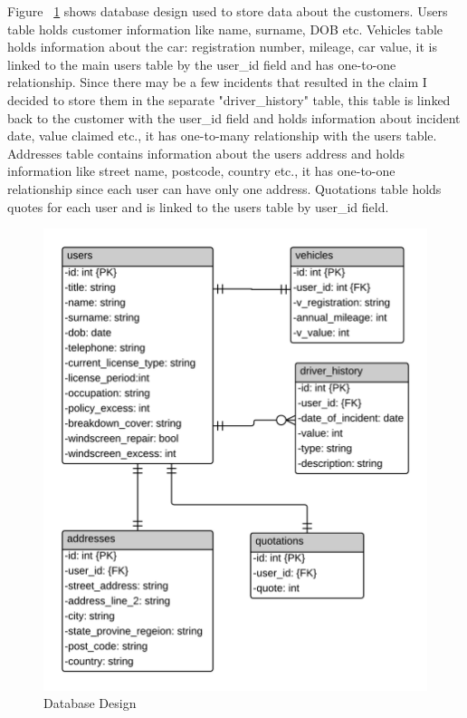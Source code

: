 \documentclass[10pt,a4paper,headinclude=true,twoside]{report}
\begin{document}
Figure ~\ref{fig:DatabaseDesign} shows database design used to store data about the customers. Users table holds customer information like name, surname, DOB etc. Vehicles table holds information about the car: registration number, mileage, car value, it is linked to the main users table by the user\_id field and has one-to-one relationship. Since there may be a few incidents that resulted in the claim I decided to store them in the separate "driver\_history" table, this table is linked back to the customer with the user\_id field and holds information about incident date, value claimed etc., it has one-to-many relationship with the users table. Addresses table contains information about the users address and holds information like street name, postcode, country etc., it has one-to-one relationship since each user can have only one address. Quotations table holds quotes for each user and is linked to the users table by user\_id field.    

\begin{figure}[H]
\centering
\centerline{\includegraphics[scale=0.198]{./DatabaseDesign}}
\caption{Database Design}
\label{fig:DatabaseDesign}
\end{figure}
\end{document}
